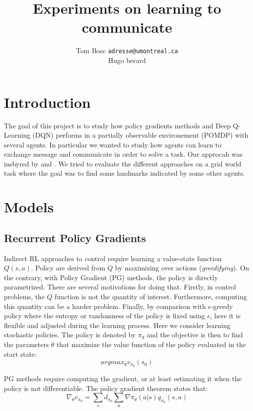 \documentclass{article} %
\title{Experiments on learning to communicate}
\author{
Tom Bosc
\texttt{adresse@umontreal.ca} \\
Hugo berard
}
\begin{document}
\maketitle

\begin{abstract}
\end{abstract}

\section{Introduction}
The goal of this project is to study how policy gradients methods and Deep Q-Learning (DQN) performs in a partially observable environement (POMDP) with several agents. In particular we wanted to study how agents can learn to exchange message and communicate in order to solve a task. Our approcah was insbyred by \cite{mordatch2017emergence} and \cite{foerster2016learning}. We tried to evaluate the different approaches on a grid world task where the goal was to find some landmarks indicated by some other agents.

\section{Models}
\subsection{Recurrent Policy Gradients}
Indirect RL approaches to control require learning a value-state function $Q(s,a)$. Policy are derived from $Q$ by maximizing over actions (\textit{greedifying}). On the contrary, with Policy Gradient (PG) methods, the policy is directly parametrized. There are several motivations for doing that\cite{sutton1998reinforcement}. Firstly, in control problems, the $Q$ function is not the quantity of interest. Furthermore, computing this quantity can be a harder problem. Finally, by comparison with $\epsilon$-greedy policy where the entropy or randomness of the policy is fixed using $\epsilon$, here it is flexible and adjusted during the learning process. Here we consider learning stochastic policies. The policy is denoted by $\pi_{\theta}$ and the objective is then to find the parameters $\theta$ that maximize the value function of the policy evaluated in the start state:
$$
argmax_{\theta} v_{\pi_{\theta}}(s_0)
$$

PG methods require computing the gradient, or at least estimating it when the policy is not differentiable. The policy gradient theorem states that:
$$
\nabla_{\theta} v_{\pi_{\theta}} = \sum_s d_{\pi_{\theta}} \sum_a \nabla \pi_{\theta}(a|s) q_{\pi_{\theta}}(s,a) %
$$
\end{document}

